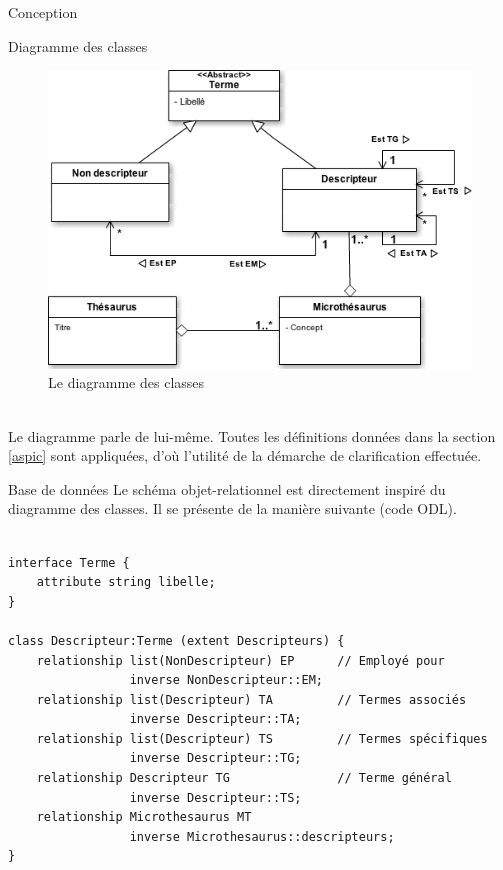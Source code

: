 \documentclass[a4paper, 12pt]{report}
\begin{document}
\begin{chapter}{Conception}
\label{tournevis}
	\begin{section}{Diagramme des classes}
		\begin{figure}[h]
			\label{classeur}
			\begin{center}
				\includegraphics[width=13cm]{Classes.png}
				\caption{Le diagramme des classes}
			\end{center}
		\end{figure}~\\
		
		Le diagramme parle de lui-même. Toutes les définitions données dans la section \ref{aspic} sont appliquées, d'où l'utilité de la démarche de clarification effectuée.\\
	\end{section}
\newpage
	\begin{section}{Base de données}
	Le schéma objet-relationnel est directement inspiré du diagramme des classes. Il se présente de la manière suivante (code ODL).\\~\\
	\begin{verbatim}
interface Terme {
	attribute string libelle;
}

class Descripteur:Terme (extent Descripteurs) {
	relationship list(NonDescripteur) EP      // Employé pour
	             inverse NonDescripteur::EM;
	relationship list(Descripteur) TA         // Termes associés
	             inverse Descripteur::TA;
	relationship list(Descripteur) TS         // Termes spécifiques
	             inverse Descripteur::TG;
	relationship Descripteur TG               // Terme général
	             inverse Descripteur::TS;
	relationship Microthesaurus MT
	             inverse Microthesaurus::descripteurs;
}


\end{verbatim}
\end{section}
\end{chapter}
\end{document}
